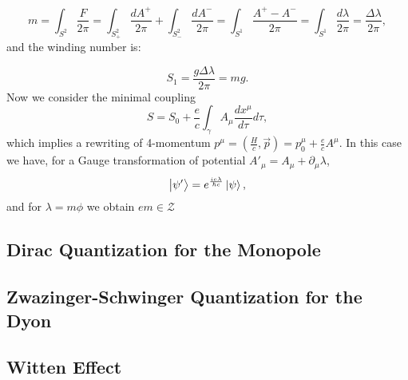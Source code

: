 \documentclass[main.tex]{subfiles}
\begin{document}
\begin{equation}
m=\int_{S^2}\frac{F}{2\pi}=\int_{S^2_+}\frac{dA^+}{2\pi}+\int_{S^2_-}\frac{dA^-}{2\pi}=\int_{S^1}\frac{A^+-A^-}{2\pi}=\int_{S^1}\frac{d\lambda}{2\pi}=\frac{\Delta\lambda}{2\pi},
\end{equation}
and the winding number is:

\begin{equation}
S_1=\frac{g\Delta\lambda}{2\pi}=mg.
\end{equation}
Now we consider the minimal coupling
\begin{equation}
S=S_0+\frac{e}{c}\int_{\gamma}A_{\mu}\frac{dx^{\mu}}{d\tau}d\tau,
\end{equation}
which implies a rewriting of 4-momentum $p^{\mu}=\left(\frac{H}{c},\vec p\right)=p_0^{\mu}+\frac{e}{c}A^{\mu}$.
In this case we have, for a Gauge transformation of potential $A'_{\mu}=A_{\mu}+\partial_{\mu}\lambda$,
\begin{equation}
\ket{\psi'}=e^{\frac{ie\lambda}{\hbar c}}\ket{\psi},
\end{equation}
and for $\lambda=m\phi$ we obtain $em\in \mathcal{Z}$

\subsection{Dirac Quantization for the Monopole}
\subsection{Zwazinger-Schwinger Quantization for the Dyon}
\subsection{Witten Effect}
\end{document}
